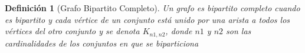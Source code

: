 \documentclass[a4paper,1pt]{report}
\newtheorem*{dfn}{Definición}
\begin{document}
\begin{dfn}[Grafo Bipartito Completo]
    Un grafo es bipartito completo cuando es bipartito y cada vértice de
un conjunto está unido por una arista a todos los vértices del otro conjunto y se denota
$K_{n1,n2}$, donde $n1$ y $n2$ son las cardinalidades de los conjuntos en que se biparticiona
\end{dfn}
\end{document}

